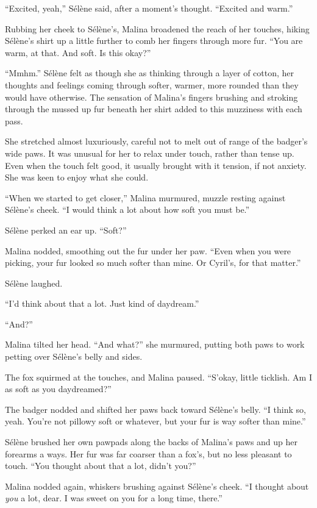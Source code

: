 ``Excited, yeah,'' Sélène said, after a moment's thought. ``Excited and warm.''

Rubbing her cheek to Sélène's, Malina broadened the reach of her touches, hiking Sélène's shirt up a little further to comb her fingers through more fur. ``You are warm, at that. And soft. Is this okay?''

``Mmhm.'' Sélène felt as though she as thinking through a layer of cotton, her thoughts and feelings coming through softer, warmer, more rounded than they would have otherwise. The sensation of Malina's fingers brushing and stroking through the mussed up fur beneath her shirt added to this muzziness with each pass.

She stretched almost luxuriously, careful not to melt out of range of the badger's wide paws. It was unusual for her to relax under touch, rather than tense up. Even when the touch felt good, it usually brought with it tension, if not anxiety. She was keen to enjoy what she could.

``When we started to get closer,'' Malina murmured, muzzle resting against Sélène's cheek. ``I would think a lot about how soft you must be.''

Sélène perked an ear up. ``Soft?''

Malina nodded, smoothing out the fur under her paw. ``Even when you were picking, your fur looked so much softer than mine. Or Cyril's, for that matter.''

Sélène laughed.

``I'd think about that a lot. Just kind of daydream.''

``And?''

Malina tilted her head. ``And what?'' she murmured, putting both paws to work petting over Sélène's belly and sides.

The fox squirmed at the touches, and Malina paused. ``S'okay, little ticklish. Am I as soft as you daydreamed?''

The badger nodded and shifted her paws back toward Sélène's belly. ``I think so, yeah. You're not pillowy soft or whatever, but your fur is way softer than mine.''

Sélène brushed her own pawpads along the backs of Malina's paws and up her forearms a ways. Her fur was far coarser than a fox's, but no less pleasant to touch. ``You thought about that a lot, didn't you?''

Malina nodded again, whiskers brushing against Sélène's cheek. ``I thought about \emph{you} a lot, dear. I was sweet on you for a long time, there.''

